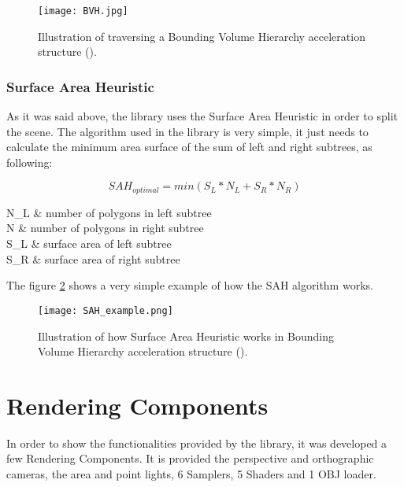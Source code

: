 \begin{figure}[H]
	\centering
	\caption{Illustration of traversing a Bounding Volume Hierarchy acceleration structure (\cite{BVH}).}
	\label{BVH.}
	\texttt{[image: BVH.jpg]}
\end{figure}

\subsubsection{Surface Area Heuristic}

\par
As it was said above, the library uses the Surface Area Heuristic in order to split the scene.
The algorithm used in the library is very simple, it just needs to calculate the minimum area surface of the sum of left and right subtrees, as following:

\begin{equation}
SAH_{optimal} = min(S_L * N_L + S_R * N_R)
\end{equation}

\begin{conditions}
	N_L & number of polygons in left subtree \\
	N   & number of polygons in right subtree \\
	S_L & surface area of left subtree \\
	S_R & surface area of right subtree \\
\end{conditions}

\par
The figure \ref{SAH.} shows a very simple example of how the SAH algorithm works.

\begin{figure}[H]
	\centering
	\caption{Illustration of how Surface Area Heuristic works in Bounding Volume Hierarchy acceleration structure (\cite{SAH}).}
	\label{SAH.}
	\texttt{[image: SAH\_example.png]}
\end{figure}


\section{Rendering Components}

\par
In order to show the functionalities provided by the library, it was developed a few Rendering Components.
It is provided the perspective and orthographic cameras, the area and point lights, 6 Samplers, 5 Shaders and 1 OBJ loader.


